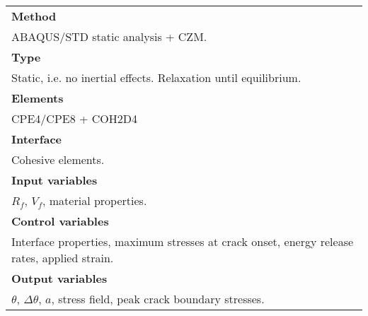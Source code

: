 \begin{table}[h!]
\scriptsize
  \centering
    \begin{tabularx}{\textwidth}{X}
    \toprule
    \midrule
    \textbf{Method}\\
    ABAQUS/STD static analysis + CZM.\\
    \midrule
    \textbf{Type}\\
    Static, i.e. no inertial effects. Relaxation until equilibrium.\\
    \midrule
    \textbf{Elements}\\
    CPE4/CPE8 + COH2D4\\
    \midrule
    \textbf{Interface}\\
    Cohesive elements.\\
    \midrule
   \textbf{Input variables}\\
    $R_{f}$, $V_{f}$, material properties.\\
    \midrule
    \textbf{Control variables}\\
    Interface properties, maximum stresses at crack onset, energy release rates, applied strain.\\
    \midrule
 \textbf{Output variables} \\
  $\theta$, $\Delta\theta$, $a$, stress field, peak crack boundary stresses.\\
  \midrule
    \bottomrule
    \end{tabularx}%
  \label{tab:analysis_tab2}%
\end{table}%